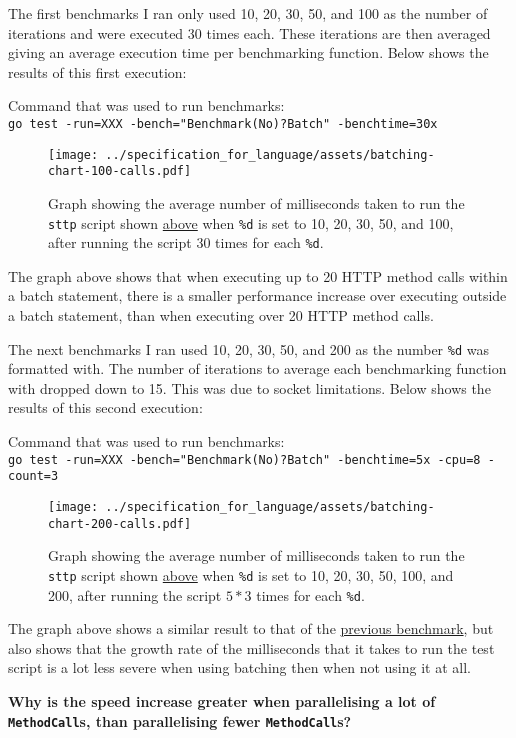 \label{sec:eval-ast-nodes-batch-bench-1-intro}
The first benchmarks I ran only used 10, 20, 30, 50, and 100 as the number of iterations and were executed 30 times each. These iterations are then averaged giving an average execution time per benchmarking function. Below shows the results of this first execution:

\begin{center}
    Command that was used to run benchmarks:\\[0.5em]
    \verb|go test -run=XXX -bench="Benchmark(No)?Batch" -benchtime=30x|
\end{center}

\begin{figure}[H]
    \centering
    \texttt{[image: ../specification\_for\_language/assets/batching-chart-100-calls.pdf]}
    \cprotect\caption{Graph showing the average number of milliseconds taken to run the \verb|sttp| script shown \hyperref[sec:eval-ast-nodes-batch-bench-snippet]{above} when \verb|%d| is set to 10, 20, 30, 50, and 100, after running the script 30 times for each \verb|%d|.}
    \label{sec:eval-ast-nodes-batch-bench-1-graph}
\end{figure}

The graph above shows that when executing up to 20 HTTP method calls within a batch statement, there is a smaller performance increase over executing outside a batch statement, than when executing over 20 HTTP method calls.

\label{sec:eval-ast-nodes-batch-bench-2-intro}

The next benchmarks I ran used 10, 20, 30, 50, and 200 as the number \verb|%d| was formatted with. The number of iterations to average each benchmarking function with dropped down to 15. This was due to socket limitations. Below shows the results of this second execution:

\begin{center}
    Command that was used to run benchmarks:\\[0.5em]
    \verb|go test -run=XXX -bench="Benchmark(No)?Batch" -benchtime=5x -cpu=8 -count=3|
\end{center}

\begin{figure}[H]
    \centering
    \texttt{[image: ../specification\_for\_language/assets/batching-chart-200-calls.pdf]}
    \cprotect\caption{Graph showing the average number of milliseconds taken to run the \verb|sttp| script shown \hyperref[sec:eval-ast-nodes-batch-bench-snippet]{above} when \verb|%d| is set to 10, 20, 30, 50, 100, and 200, after running the script $5 * 3$ times for each \verb|%d|.}
    \label{sec:eval-ast-nodes-batch-bench-2-graph}
\end{figure}

The graph above shows a similar result to that of the \hyperref[sec:eval-ast-nodes-batch-bench-1-intro]{previous benchmark}, but also shows that the growth rate of the milliseconds that it takes to run the test script is a lot less severe when using batching then when not using it at all.

\cprotect\textbf{Why is the speed increase greater when parallelising a lot of \verb|MethodCall|s, than parallelising fewer \verb|MethodCall|s?}